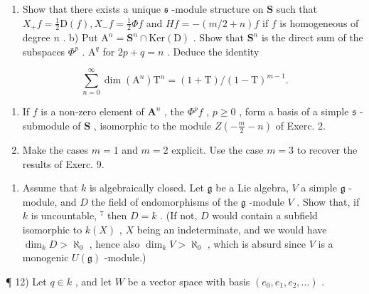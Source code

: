\begin{enumerate}
\def\labelenumi{\alph{enumi})}
\tightlist
\item
  Show that there exists a unique \(\mathfrak{s}\) -module structure on \(\mathbf{S}\) such that \(X_{+}f = \frac{1}{2}\mathrm{D}(f), X_{-}f = \frac{1}{2}\Phi f\) and \(Hf = -(m / 2 + n)f\) if \(f\) is homogeneous of degree \(n\) . b) Put \(\mathrm{A}^n = \mathbf{S}^n \cap \mathrm{Ker}(\mathrm{D})\) . Show that \(\mathbf{S}^n\) is the direct sum of the subspaces \(\Phi^p\) . \(\mathrm{A}^q\) for \(2p + q = n\) . Deduce the identity
\end{enumerate}

\[
\sum_ {n = 0} ^ {\infty} \dim (\mathrm{A} ^ {n}) \mathrm{T} ^ {n} = (1 + \mathrm{T}) / (1 - \mathrm{T}) ^ {m - 1}.
\]

\begin{enumerate}
\def\labelenumi{\alph{enumi})}
\setcounter{enumi}{2}
\item
  If \(f\) is a non-zero element of \(\mathbf{A}^n\) , the \(\varPhi^p f\) , \(p \geq 0\) , form a basis of a simple \(\mathfrak{s}\) -submodule of \(\mathbf{S}\) , isomorphic to the module \(Z\left(-\frac{m}{2} - n\right)\) of Exerc. 2.
\item
  Make the cases \(m = 1\) and \(m = 2\) explicit. Use the case \(m = 3\) to recover the results of Exerc. 9.
\end{enumerate}

\begin{enumerate}
\def\labelenumi{\arabic{enumi})}
\setcounter{enumi}{10}
\tightlist
\item
  Assume that \(k\) is algebraically closed. Let \(\mathfrak{g}\) be a Lie algebra, \(V\) a simple \(\mathfrak{g}\) -module, and \(D\) the field of endomorphisms of the \(\mathfrak{g}\) -module \(V\) . Show that, if \(k\) is uncountable, \(^7\) then \(D = k\) . (If not, \(D\) would contain a subfield isomorphic to \(k(X)\) , \(X\) being an indeterminate, and we would have \(\dim_k D > \aleph_0\) , hence also \(\dim_k V > \aleph_0\) , which is absurd since \(V\) is a monogenic \(U(\mathfrak{g})\) -module.)
\end{enumerate}


¶ 12) Let \(q \in k\) , and let \(W\) be a vector space with basis \((e_0, e_1, e_2, \ldots)\) .

